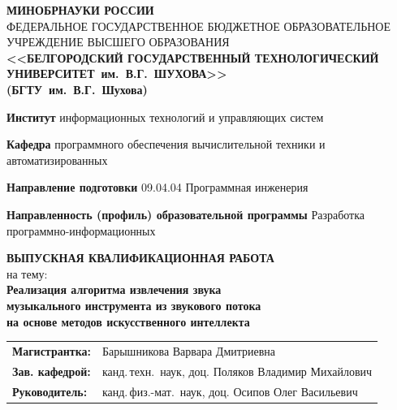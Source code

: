 \documentclass[14pt]{extarticle}
\begin{document}
\newpage
\begin{center}
	\small
	\textbf{МИНОБРНАУКИ РОССИИ} \\[0.5em]
	ФЕДЕРАЛЬНОЕ ГОСУДАРСТВЕННОЕ БЮДЖЕТНОЕ ОБРАЗОВАТЕЛЬНОЕ УЧРЕЖДЕНИЕ 
	ВЫСШЕГО ОБРАЗОВАНИЯ \\[0.3em]
	\textbf{<<БЕЛГОРОДСКИЙ ГОСУДАРСТВЕННЫЙ ТЕХНОЛОГИЧЕСКИЙ\\УНИВЕРСИТЕТ~им.~В.Г.~ШУХОВА>>}\\
	\textbf{(БГТУ~им.~В.Г.~Шухова)}
\end{center}
\vspace{1em}
\begin{list}{}{\setlength{\leftmargin}{0cm}\setlength{\parsep}{1pt}}
	\small\sloppy
	\item\textbf{Институт} информационных технологий и управляющих систем
	\item\textbf{Кафедра} программного обеспечения вычислительной техники и автоматизированных 
	\item\textbf{Направление подготовки} 09.04.04 Программная инженерия
	\item\textbf{Направленность (профиль) образовательной программы} Разработка программно-информационных 
\end{list}
\vspace{0.5cm}	
\begin{center}
\textbf{ВЫПУСКНАЯ КВАЛИФИКАЦИОННАЯ РАБОТА} \\[0em]
на тему: \\[1em]
\textbf{Реализация алгоритма извлечения звука\\музыкального инструмента из звукового потока\\на основе методов искусственного интеллекта} 
\end{center}
\vfill
\begin{flushleft}
	\small
	\begin{tabular}{@{}l l@{}}
		\hspace{0cm}\textbf{Магистрантка:}    & Барышникова Варвара Дмитриевна \\
		\hspace{0cm}\textbf{Зав. кафедрой:}   & канд.\,техн.\ наук, доц. Поляков Владимир Михайлович \\
		\hspace{0cm}\textbf{Руководитель:}    & канд.\,физ.-мат.\ наук, доц. Осипов Олег Васильевич
	\end{tabular}
\end{flushleft}
\end{document}
